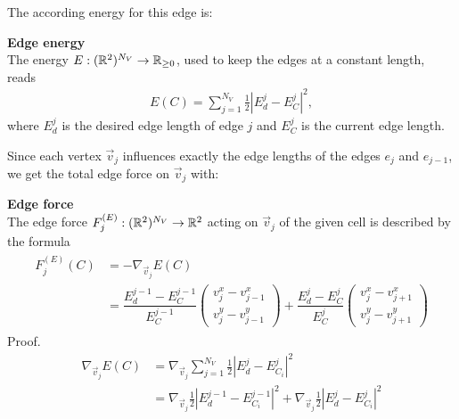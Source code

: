 The according energy for this edge is:
\begin{definition} \textbf{Edge energy} \\
	The energy $E: (\mathbb{R}^2)^{N_V} \rightarrow \mathbb{R}_{\geq 0}$, used to keep the edges at a constant length, reads 
	\begin{align}
		E(C) =  \sum\limits_{j=1}^{N_V} \frac{1}{2} | E^{j}_d - E^j_{C}|^2, \label{eq:edgeEnergy} 
	\end{align}
	where $E^{j}_d$ is the desired edge length of edge $j$ and $E^j_{C}$ is the current edge length. 
\end{definition}

Since each vertex $\vec{v}_j$ influences exactly the edge lengths of the edges $e_{j}$ and $e_{j-1}$, we get the total edge force on $\vec{v}_j$ with: 

\begin{proposition} \textbf{Edge force} \\

	The edge force $F^{(E)}_j: (\mathbb{R}^2)^{N_V} \rightarrow \mathbb{R}^2$ acting on $\vec{v}_j$ of the given cell is described by the formula
	\begin{align}
		\begin{split}
			F^{(E)}_j(C) &= - \nabla_{\vec{v}_j} E(C) \\
				&= \dfrac{E_d^{j-1} - E^{j-1}_{C}}{E^{j-1}_{C}}  \begin{pmatrix} v_{j}^{x} - v_{j-1}^{x} \\[0.5em]  v_{j}^{y} - v_{j-1}^{y}  \end{pmatrix}
				+ \dfrac{E_d^{j} - E^j_{C}}{E^j_{C}}  \begin{pmatrix} v_{j}^{x} - v_{j+1}^{x} \\[0.5em]  v_{j}^{y} - v_{j+1}^{y} 
			\end{pmatrix}
		\end{split}
		\label{force:edge}
	\end{align}
	Proof. \\

	\begin{align*}
		\nabla_{\vec{v}_{j}} E(C) &= \nabla_{\vec{v}_{j}} \sum\limits_{j=1}^{N_V} \frac{1}{2} | E^{j}_d - E^j_{C_i}|^2 \\
		&= \nabla_{\vec{v}_{j}} \frac{1}{2} | E^{j-1}_d - E^{j-1}_{C_i}|^2 + \nabla_{\vec{v}_{j}} \frac{1}{2} | E^{j}_d - E^j_{C_i}|^2 
	\end{align*}


\end{proposition}

